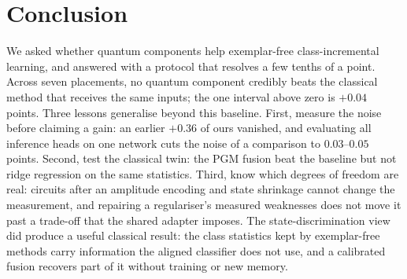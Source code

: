 \section{Conclusion}
\label{sec:conclusion}

We asked whether quantum components help exemplar-free class-incremental
learning, and answered with a protocol that resolves a few tenths of a point.
Across seven placements, no quantum component credibly beats the classical
method that receives the same inputs; the one interval above zero is
$+0.04$ points. Three lessons generalise beyond this baseline. First, measure
the noise before claiming a gain: an earlier $+0.36$ of ours vanished, and
evaluating all inference heads on one network cuts the noise of a comparison
to $0.03$--$0.05$ points. Second, test the classical twin: the PGM fusion beat
the baseline but not ridge regression on the same statistics. Third, know which
degrees of freedom are real: circuits after an amplitude encoding and state
shrinkage cannot change the measurement, and repairing a regulariser's measured
weaknesses does not move it past a trade-off that the shared adapter imposes.
The state-discrimination view did produce a useful classical result: the class
statistics kept by exemplar-free methods carry information the aligned
classifier does not use, and a calibrated fusion recovers part of it without
training or new memory.
